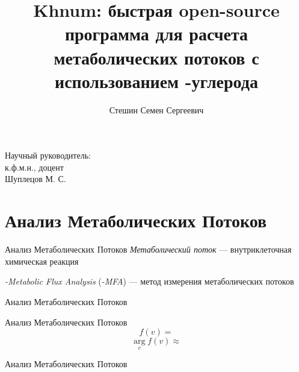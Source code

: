 \documentclass[aspectratio=169]{beamer}
\title{Khnum: быстрая open-source программа для расчета метаболических потоков с использованием \ce{^{13}C}-углерода}
\author{Стешин Семен Сергеевич}
\institute{МГУ ВМК, кафедра математической кибернетики, 2020}
\date{}
\begin{document}
\begin{frame}[plain]
    \maketitle
    \begin{small}
    	 \begin{flushright}
    		Научный руководитель:\\
    		к.ф.м.н., доцент \\
    		Шуплецов М. С.
    	\end{flushright}
    \end{small}
   
\end{frame}

\section{Анализ Метаболических Потоков}
\begin{frame}{Анализ Метаболических Потоков}
\emph{Метаболический поток} --- внутриклеточная химическая реакция \pause

\emph{-Metabolic Flux Analysis} (\emph{-MFA}) --- метод измерения метаболических потоков
\end{frame}

\begin{frame}{Анализ Метаболических Потоков}
\end{frame}

\begin{frame}{Анализ Метаболических Потоков}
	\huge
	$$f(v) = $$ \pause
	$$\operatorname*{arg}_v f(v) \approx $$
\end{frame}

\begin{frame}{Анализ Метаболических Потоков}
	\begin{itemize}
	\end{itemize}
\end{frame}
\end{document}
